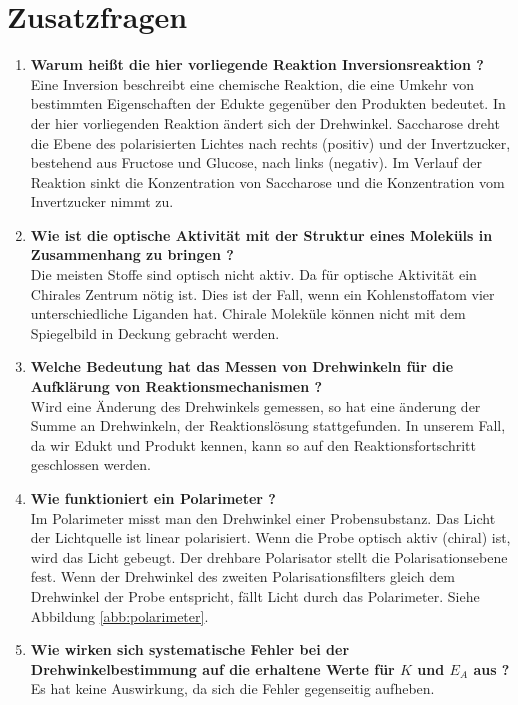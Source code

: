 \section{Zusatzfragen}
\begin{enumerate}
	\item  \textbf{Warum heißt die hier vorliegende Reaktion Inversionsreaktion ?}\\
	Eine Inversion beschreibt eine chemische Reaktion, die eine Umkehr von bestimmten Eigenschaften der Edukte gegenüber den Produkten bedeutet. 
	In der hier vorliegenden Reaktion ändert sich der Drehwinkel. 
	Saccharose dreht die Ebene des polarisierten Lichtes nach rechts (positiv) und der Invertzucker, bestehend aus Fructose und Glucose, nach links (negativ). 
	Im Verlauf der Reaktion sinkt die Konzentration von Saccharose und die Konzentration vom Invertzucker nimmt zu.\\
	\item \textbf{Wie ist die optische Aktivität mit der Struktur eines Moleküls in Zusammenhang zu bringen ?}\\
	Die meisten Stoffe sind optisch nicht aktiv.
	Da für optische Aktivität ein Chirales Zentrum nötig ist.
	Dies ist der Fall, wenn ein Kohlenstoffatom vier unterschiedliche Liganden hat.
	Chirale Moleküle können nicht mit dem Spiegelbild in Deckung gebracht werden.
	\item \textbf{Welche Bedeutung hat das Messen von Drehwinkeln für die Aufklärung von Reaktionsmechanismen ?}\\
	Wird eine Änderung des Drehwinkels gemessen, so hat eine änderung der Summe an Drehwinkeln, der Reaktionslösung stattgefunden.
	In unserem Fall, da wir Edukt und Produkt kennen, kann so auf den Reaktionsfortschritt geschlossen werden.
	\item \textbf{Wie funktioniert ein Polarimeter ?}\\
	Im Polarimeter misst man den Drehwinkel einer Probensubstanz. 
	Das Licht der Lichtquelle ist linear polarisiert. 
	Wenn die Probe optisch aktiv (chiral) ist, wird das Licht gebeugt. 
	Der drehbare Polarisator stellt die Polarisationsebene fest. 
	Wenn der Drehwinkel des zweiten Polarisationsfilters gleich dem Drehwinkel der Probe entspricht, fällt Licht durch das Polarimeter.
	Siehe Abbildung \ref{abb:polarimeter}.\\
	\item \textbf{Wie wirken sich systematische Fehler bei der Drehwinkelbestimmung auf die erhaltene Werte für $K$ und $E_A$ aus ?}\\
	Es hat keine Auswirkung, da sich die Fehler gegenseitig aufheben. 
\cite{polarimeter}
\end{enumerate}
\newpage

